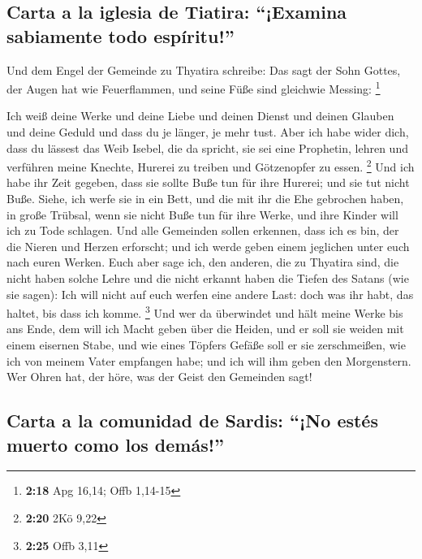 \hypertarget{carta-a-la-iglesia-de-tiatira-examina-sabiamente-todo-espuxedritu}{%
\subsection{Carta a la iglesia de Tiatira: ``¡Examina sabiamente todo
espíritu!''}\label{carta-a-la-iglesia-de-tiatira-examina-sabiamente-todo-espuxedritu}}

 Und dem Engel der Gemeinde zu Thyatira schreibe: Das
sagt der Sohn Gottes, der Augen hat wie Feuerflammen, und seine Füße
sind gleichwie Messing: \footnote{\textbf{2:18} Apg 16,14; Offb 1,14-15}

 Ich weiß deine Werke und deine Liebe und deinen Dienst
und deinen Glauben und deine Geduld und dass du je länger, je mehr tust.
 Aber ich habe wider dich, dass du lässest das Weib
Isebel, die da spricht, sie sei eine Prophetin, lehren und verführen
meine Knechte, Hurerei zu treiben und Götzenopfer zu essen. \footnote{\textbf{2:20}
  2Kö 9,22}  Und ich habe ihr Zeit gegeben, dass sie
sollte Buße tun für ihre Hurerei; und sie tut nicht Buße.
 Siehe, ich werfe sie in ein Bett, und die mit ihr die
Ehe gebrochen haben, in große Trübsal, wenn sie nicht Buße tun für ihre
Werke,  und ihre Kinder will ich zu Tode schlagen. Und
alle Gemeinden sollen erkennen, dass ich es bin, der die Nieren und
Herzen erforscht; und ich werde geben einem jeglichen unter euch nach
euren Werken.  Euch aber sage ich, den anderen, die zu
Thyatira sind, die nicht haben solche Lehre und die nicht erkannt haben
die Tiefen des Satans (wie sie sagen): Ich will nicht auf euch werfen
eine andere Last:  doch was ihr habt, das haltet, bis
dass ich komme. \footnote{\textbf{2:25} Offb 3,11}  Und
wer da überwindet und hält meine Werke bis ans Ende, dem will ich Macht
geben über die Heiden,  und er soll sie weiden mit einem
eisernen Stabe, und wie eines Töpfers Gefäße soll er sie zerschmeißen,
 wie ich von meinem Vater empfangen habe; und ich will
ihm geben den Morgenstern.  Wer Ohren hat, der höre, was
der Geist den Gemeinden sagt!

\hypertarget{carta-a-la-comunidad-de-sardis-no-estuxe9s-muerto-como-los-demuxe1s}{%
\subsection{Carta a la comunidad de Sardis: ``¡No estés muerto como los
demás!''}\label{carta-a-la-comunidad-de-sardis-no-estuxe9s-muerto-como-los-demuxe1s}}

